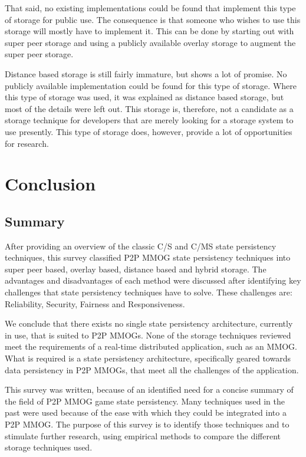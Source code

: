 \documentclass[10pt,a4paper,journal,cspaper,compsoc]{IEEEtran}
\begin{document}
That said, no existing implementations could be found that implement this type of storage for public use. The consequence is that someone who wishes
to use this storage will mostly have to implement it. This can be done by starting out with super peer storage and using a publicly available overlay
storage to augment the super peer storage.

Distance based storage is still fairly immature, but shows a lot of promise. No publicly available implementation could be found for this type of
storage. Where this type of storage was used, it was explained as distance based storage, but most of the details were left out. This storage is,
therefore, not a candidate as a storage technique for developers that are merely looking for a storage system to use presently. This type of storage
does, however, provide a lot of opportunities for research.

\section{Conclusion}
\label{conclusion}

\subsection{Summary}
After providing an overview of the classic C/S and C/MS state persistency techniques, this survey classified P2P MMOG state persistency techniques
into super peer based, overlay based, distance based and hybrid storage. The advantages and disadvantages of each method were discussed after
identifying key challenges that state persistency techniques have to solve. These challenges are: Reliability, Security, Fairness and Responsiveness.

We conclude that there exists no single state persistency architecture, currently in use, that is suited to P2P MMOGs. None of the storage techniques
reviewed meet the requirements of a real-time distributed application, such as an MMOG. What is required is a state persistency architecture,
specifically geared towards data persistency in P2P MMOGs, that meet all the challenges of the application.

This survey was written, because of an identified need for a concise summary of the field of P2P MMOG game state persistency. Many techniques used in
the past were used because of the ease with which they could be integrated into a P2P MMOG. The purpose of this survey is to identify those
techniques and to stimulate further research, using empirical methods to compare the different storage techniques used.
\end{document}
